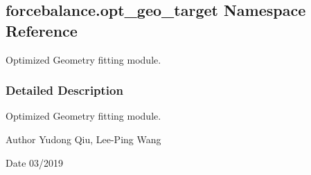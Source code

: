 \hypertarget{namespaceforcebalance_1_1opt__geo__target}{}\subsection{forcebalance.\+opt\+\_\+geo\+\_\+target Namespace Reference}
\label{namespaceforcebalance_1_1opt__geo__target}


Optimized Geometry fitting module.  




\subsubsection{Detailed Description}
Optimized Geometry fitting module. 

\begin{DoxyAuthor}{Author}
Yudong Qiu, Lee-\/\+Ping Wang 
\end{DoxyAuthor}
\begin{DoxyDate}{Date}
03/2019 
\end{DoxyDate}
